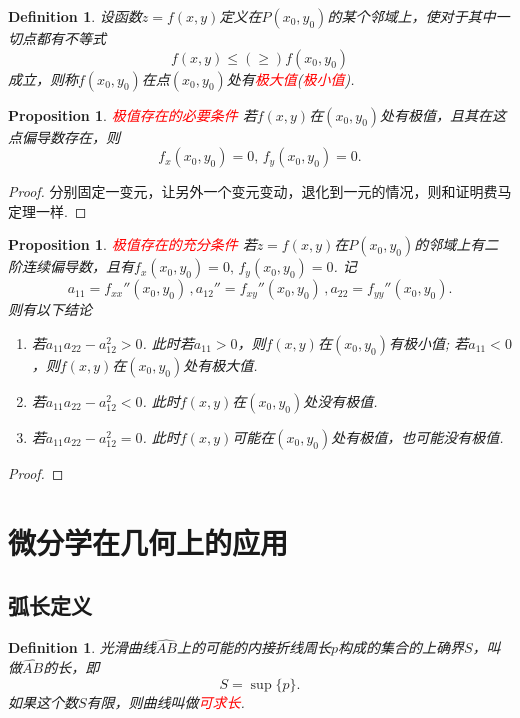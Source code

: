 \documentclass{article}
\newtheorem{proposition}[theorem]{Proposition}
\newtheorem{definition}[theorem]{Definition}
\newcommand{\redt}[1]{\textcolor{red}{#1}}
\begin{document}
\begin{definition}
\rm 设函数$z=f(x,y)$定义在$P(x_0,y_0)$的某个邻域上，使对于其中一切点都有不等式
$$
f(x,y) \leq (\geq) f(x_0,y_0)
$$
成立，则称$f(x_0,y_0)$在点$(x_0,y_0)$处有\redt{极大值}(\redt{极小值}).
\end{definition}

\begin{proposition}
\rm \redt{极值存在的必要条件} 若$f(x,y)$在$(x_0,y_0)$处有极值，且其在这点偏导数存在，则
$$
f_x(x_0,y_0) = 0, \, f_y(x_0,y_0) = 0.
$$
\end{proposition}

\begin{proof}
分别固定一变元，让另外一个变元变动，退化到一元的情况，则和证明费马定理一样.
\end{proof}

\begin{proposition}
\rm \redt{极值存在的充分条件} 若$z=f(x,y)$在$P(x_0,y_0)$的邻域上有二阶连续偏导数，且有$f_x(x_0,y_0) = 0 ,\,f_y(x_0,y_0) = 0$. 记
$$
a_{11} = f_{xx}''(x_0,y_0)\,, a_{12}'' = f_{xy}''(x_0,y_0)\, , a_{22} = f_{yy}''(x_0,y_0).
$$
则有以下结论
\begin{enumerate}
	\item 若$a_{11}a_{22} - a_{12}^2 > 0$. 此时若$a_{11} > 0$，则$f(x,y)$在$(x_0,y_0)$有极小值; 若$a_{11} < 0$，则$f(x,y)$在$(x_0,y_0)$处有极大值.
	\item 若$a_{11}a_{22} - a_{12}^2 < 0$. 此时$f(x,y)$在$(x_0,y_0)$处没有极值.
	\item 若$a_{11}a_{22} - a_{12}^2 = 0$. 此时$f(x,y)$可能在$(x_0,y_0)$处有极值，也可能没有极值. 
\end{enumerate}
\end{proposition}

\begin{proof}
\rm 
\end{proof}

\newpage
\section{微分学在几何上的应用}

\subsection{弧长定义}

\begin{definition}
\rm 光滑曲线$\widehat{AB}$上的可能的内接折线周长$p$构成的集合的上确界$S$，叫做$\widehat{AB}$的长，即
$$
S = \sup\{p\}.
$$
如果这个数$S$有限，则曲线叫做\redt{可求长}.
\end{definition}
\end{document}
